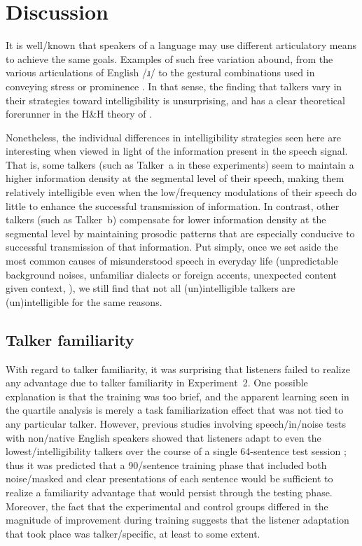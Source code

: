 \chapter{Discussion\label{chap:Discussion}}
It is well\-/known that speakers of a language may use different articulatory means to achieve the same goals.  Examples of such free variation abound, from the various articulations of English /ɹ/ \citep{Hagiwara1995, CampbellEtAl2010} to the gestural combinations used in conveying stress or prominence \citep{deJong1995}.  In that sense, the finding that talkers vary in their strategies toward intelligibility is unsurprising, and has a clear theoretical forerunner in the H\&H theory of \citet{Lindblom1990}.

Nonetheless, the individual differences in intelligibility strategies seen here are interesting when viewed in light of the information present in the speech signal.  That is, some talkers (such as Talker~\ac{a} in these experiments) seem to maintain a higher information density at the segmental level of their speech, making them relatively intelligible even when the low\-/frequency modulations of their speech do little to enhance the successful transmission of information.  In contrast, other talkers (such as Talker~\ac{b}) compensate for lower information density at the segmental level by maintaining prosodic patterns that are especially conducive to successful transmission of that information.  Put simply, once we set aside the most common causes of misunderstood speech in everyday life (unpredictable background noises, unfamiliar dialects or foreign accents, unexpected content given context, \etc), we still find that not all (un)intelligible talkers are (un)intelligible for the same reasons.

\section{Talker familiarity}
With regard to talker familiarity, it was surprising that listeners failed to realize any advantage due to talker familiarity in Experiment~2.  One possible explanation is that the training was too brief, and the apparent learning seen in the quartile analysis is merely a task familiarization effect that was not tied to any particular talker.  However, previous studies involving speech\-/in\-/noise tests with non\-/native English speakers showed that listeners adapt to even the lowest\-/intelligibility talkers over the course of a single 64-sentence test session \citep{BradlowBent2008}; thus it was predicted that a 90\-/sentence training phase that included both noise\-/masked and clear presentations of each sentence would be sufficient to realize a familiarity advantage that would persist through the testing phase.  Moreover, the fact that the experimental and control groups differed in the magnitude of improvement during training suggests that the listener adaptation that took place was talker\-/specific, at least to some extent.  

